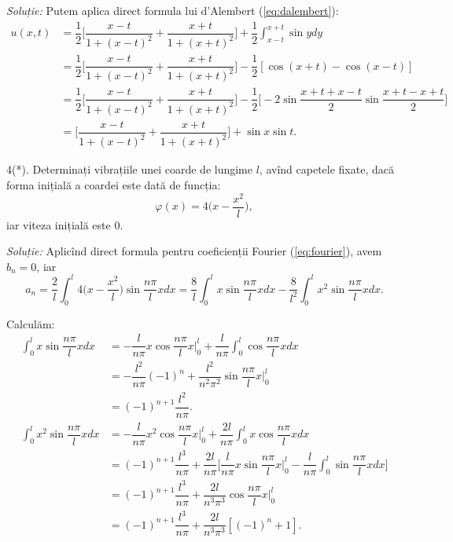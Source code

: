 \emph{Soluție:} Putem aplica direct formula lui d'Alembert (\ref{eq:dalembert}):
\begin{align*}
    u(x, t) &= \dfrac{1}{2} \Big[ \dfrac{x - t}{1 + (x - t)^2} + \dfrac{x + t}{1 + (x + t)^2} \Big] + %
    \dfrac{1}{2} \int_{x - t}^{x + t} \sin y dy \\
            &= \dfrac{1}{2} \Big[ \dfrac{x - t}{1 + (x - t)^2} + \dfrac{x + t}{1 + (x + t)^2} \Big] - %
            \dfrac{1}{2}[\cos(x + t) - \cos(x - t)] \\
            &= \dfrac{1}{2} \Big[ \dfrac{x - t}{1 + (x - t)^2} + \dfrac{x + t}{1 + (x + t)^2} \Big] - %
            \dfrac{1}{2} \Big[ -2\sin \dfrac{x + t + x - t}{2} \sin \dfrac{x + t - x + t}{2} \Big] \\
            &= \Big[ \dfrac{x - t}{1 + (x - t)^2} + \dfrac{x + t}{1 + (x + t)^2} \Big] + \sin x \sin t.
\end{align*}

\vspace{0.3cm}

4(*). Determinați vibrațiile unei coarde de lungime $ l $, avînd capetele fixate,
dacă forma inițială a coardei este dată de funcția:
\[
    \varphi(x) = 4 \Big( x - \dfrac{x^2}{l} \Big),
\]
iar viteza inițială este $ 0 $.

\vspace{0.3cm}

\emph{Soluție:} Aplicînd direct formula pentru coeficienții Fourier (\ref{eq:fourier}),
avem $ b_n = 0 $, iar
\[
    a_n = \dfrac{2}{l} \int_0^l 4\Big( x - \dfrac{x^2}{l} \Big) \sin \dfrac{n\pi}{l} xdx = %
    \dfrac{8}{l} \int_0^l x \sin \dfrac{n\pi}{l} xdx - %
    \dfrac{8}{l^2} \int_0^l x^2 \sin \dfrac{n\pi}{l}xdx.
\]

Calculăm:
\begin{align*}
    \int_0^l x\sin \dfrac{n\pi}{l} xdx &= -\dfrac{l}{n\pi} x \cos \dfrac{n\pi}{l}x \Big|_0^l + %
    \dfrac{l}{n\pi} \int_0^l \cos \dfrac{n\pi}{l} xdx \\
                                       &= -\dfrac{l^2}{n\pi}(-1)^n + %
                                       \dfrac{l^2}{n^2 \pi^2} \sin\dfrac{n\pi}{l} x\Big|_0^l \\
                                       &= (-1)^{n + 1} \dfrac{l^2}{n\pi}. \\
    \int_0^l x^2 \sin \dfrac{n\pi}{l} xdx &= -\dfrac{l}{n\pi}x^2 \cos \dfrac{n\pi}{l}x \Big|_0^l + %
    \dfrac{2l}{n\pi}\int_0^l x\cos \dfrac{n\pi}{l} xdx \\
                                          &= (-1)^{n + 1} \dfrac{l^3}{n\pi} + %
                                          \dfrac{2l}{n\pi}\Big[ \dfrac{l}{n\pi} x\sin \dfrac{n\pi}{l}x\Big|_0^l - \dfrac{l}{n\pi}\int_0^l \sin \dfrac{n\pi}{l}xdx \Big] \\
                                          &= (-1)^{n + 1}\dfrac{l^3}{n\pi} + %
                                          \dfrac{2l}{n^3 \pi^3}\cos \dfrac{n\pi}{l}x\Big|_0^l \\
                                          &= (-1)^{n + 1} \dfrac{l^3}{n\pi} + \dfrac{2l}{n^3 \pi^3}[(-1)^n + 1].
\end{align*}

